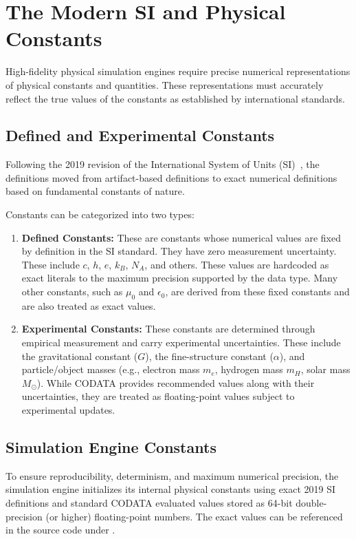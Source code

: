 \section{The Modern SI and Physical Constants}\label{sec:modern-si}

High-fidelity physical simulation engines require precise numerical representations of physical constants and quantities. 
These representations must accurately reflect the true values of the constants as established by international standards.

\subsection{Defined and Experimental Constants}
Following the 2019 revision of the International System of Units (SI)~\cite{BIPM2019SIBrochure,Newell2019NIST330}, 
the definitions moved from artifact-based definitions to exact numerical definitions based on fundamental constants of nature.

Constants can be categorized into two types: 
\begin{enumerate}
\item \textbf{Defined Constants:} These are constants whose numerical values are fixed by definition in the SI standard. 
    They have zero measurement uncertainty. 
    These include $c$, $h$, $e$, $k_B$, $N_A$, and others.
    These values are hardcoded as exact literals to the maximum precision supported by the data type.
    Many other constants, such as $\mu_0$ and $\epsilon_0$, are derived from these fixed constants 
    and are also treated as exact values.
\item \textbf{Experimental Constants:} These constants are determined through empirical measurement 
    and carry experimental uncertainties\cite{Mohr2016CODATA}. 
    These include the gravitational constant ($G$), the fine-structure constant ($\alpha$), 
    and particle/object masses (e.g., electron mass $m_e$, hydrogen mass $m_H$, solar mass $M_\odot$). 
    While CODATA provides recommended values along with their uncertainties, 
    they are treated as floating-point values subject to experimental updates.
\end{enumerate}

\subsection{Simulation Engine Constants}\label{subsec:engine-constants}

To ensure reproducibility, determinism, and maximum numerical precision, 
the simulation engine initializes its internal physical constants using exact 2019 SI definitions\cite{Newell2019NIST330, BIPM2019SIBrochure} 
and standard CODATA evaluated values\cite{Mohr2016CODATA} stored as 64-bit double-precision (or higher) floating-point numbers.
The exact values can be referenced in the source code under .
